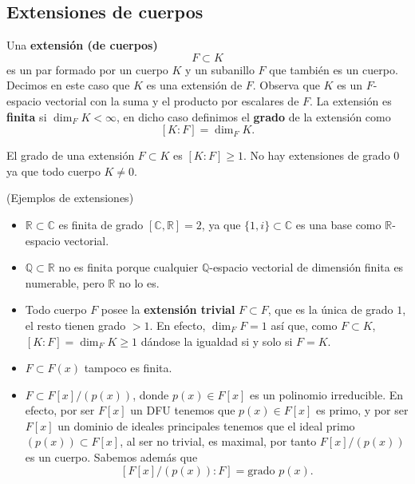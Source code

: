 
\hypertarget{extensiones-de-cuerpos}{%
\subsection{Extensiones de cuerpos}\label{extensiones-de-cuerpos}}


Una \textbf{extensión (de cuerpos)} \[F\subset K\] es un par formado por
un cuerpo \(K\) y un subanillo \(F\) que también es un cuerpo. Decimos
en este caso que \(K\) es una extensión de \(F\). Observa que \(K\) es
un \(F\)-espacio vectorial con la suma y el producto por escalares de
\(F\). La extensión es \textbf{finita} si \(\dim_FK<\infty\), en dicho
caso definimos el \textbf{grado} de la extensión como
\[[K:F]=\dim_FK.\] 


El grado de una extensión \(F\subset K\) es \([K:F]\geq 1\). No hay
extensiones de grado \(0\) ya que todo cuerpo \(K\neq {0}\).

\textrm{\normalfont (Ejemplos de extensiones)}

\begin{itemize}
\item
  \(\mathbb R\subset\mathbb C\) es finita de grado
  \([\mathbb{C},\mathbb{R}]=2\), ya que \(\{1,i\}\subset\mathbb C\) es
  una base como \(\mathbb R\)-espacio vectorial.
\item
  \(\mathbb Q\subset\mathbb R\) no es finita porque cualquier
  \(\mathbb Q\)-espacio vectorial de dimensión finita es numerable, pero
  \(\mathbb R\) no lo es.
\item
  Todo cuerpo \(F\) posee la \textbf{extensión trivial} \(F\subset F\),
  que es la única de grado \(1\), el resto tienen grado \(>1\). En
  efecto, \(\dim_FF=1\) así que, como \(F\subset K\),
  \([K:F]=\dim_FK\geq 1\) dándose la igualdad si y solo si \(F=K\).
\item
  \(F\subset F(x)\) tampoco es finita.
\item
  \(F\subset F[x]/(p(x))\), donde \(p(x)\in F[x]\) es un polinomio
  irreducible. En efecto, por ser \(F[x]\) un DFU tenemos que
  \(p(x)\in F[x]\) es primo, y por ser \(F[x]\) un dominio de ideales
  principales tenemos que el ideal primo \((p(x))\subset F[x]\), al ser
  no trivial, es maximal, por tanto \(F[x]/(p(x))\) es un cuerpo.
  Sabemos además que \[[F[x]/(p(x)):F]=\text{grado }p(x).\]
\end{itemize}

